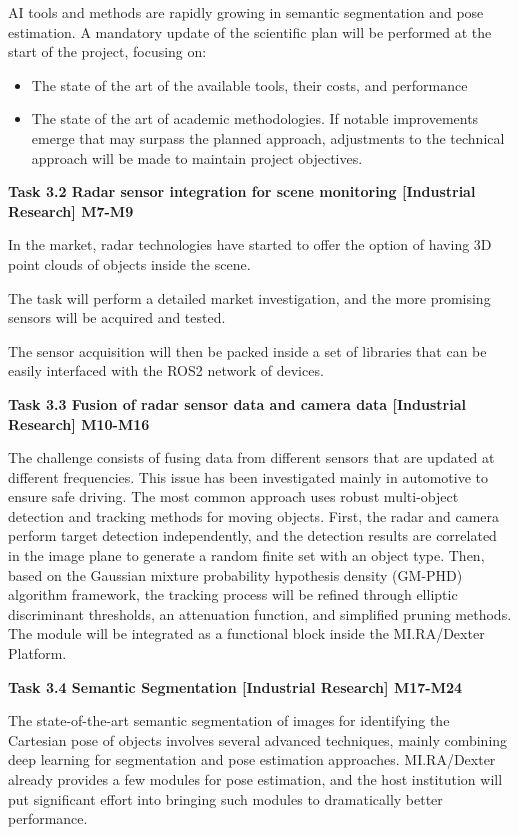 \begin{longtable}[]
{\begin{minipage}[t]{\linewidth}
AI tools and methods are rapidly growing in semantic segmentation and
pose estimation. A mandatory update of the scientific plan will be
performed at the start of the project, focusing on:

\begin{itemize}
\item
  The state of the art of the available tools, their costs, and
  performance
\item
  The state of the art of academic methodologies. If notable
  improvements emerge that may surpass the planned approach, adjustments
  to the technical approach will be made to maintain project objectives.
\end{itemize}

\textbf{Task 3.2 Radar sensor integration for scene monitoring
{[}Industrial Research{]} M7-M9}

In the market, radar technologies have started to offer the option of
having 3D point clouds of objects inside the scene.

The task will perform a detailed market investigation, and the more
promising sensors will be acquired and tested.

The sensor acquisition will then be packed inside a set of libraries
that can be easily interfaced with the ROS2 network of devices.

\textbf{Task 3.3 Fusion of radar sensor data and camera data
{[}Industrial Research{]} M10-M16}

The challenge consists of fusing data from different sensors that are
updated at different frequencies. This issue has been investigated
mainly in automotive to ensure safe driving. The most common approach
uses robust multi-object detection and tracking methods for moving
objects. First, the radar and camera perform target detection
independently, and the detection results are correlated in the image
plane to generate a random finite set with an object type. Then, based
on the Gaussian mixture probability hypothesis density (GM-PHD)
algorithm framework, the tracking process will be refined through
elliptic discriminant thresholds, an attenuation function, and
simplified pruning methods. The module will be integrated as a
functional block inside the MI.RA/Dexter Platform.

\textbf{Task 3.4 Semantic Segmentation {[}Industrial Research{]}
M17-M24}

The state-of-the-art semantic segmentation of images for identifying the
Cartesian pose of objects involves several advanced techniques, mainly
combining deep learning for segmentation and pose estimation approaches.
MI.RA/Dexter already provides a few modules for pose estimation, and the
host institution will put significant effort into bringing such modules
to dramatically better performance.


\end{minipage}}
\end{longtable}
